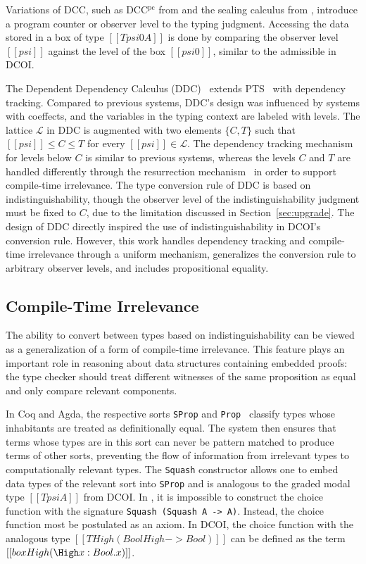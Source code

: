 \documentclass[acmsmall]{acmart}
\newcommand{\name}{DCOI\xspace}
\begin{document}
Variations of DCC, such as DCC$^{\text{pc}}$ from
\citet{tse2004translating} and the sealing
calculus from \citet{shikuma2008proving}, introduce a program counter
or observer level to the typing judgment. Accessing the data
stored in a box of type $[[T psi0 A]]$ is done by comparing the observer
level $[[psi]]$ against the level of the box $[[psi0]]$, similar to
the admissible  in \name{}. 

The Dependent Dependency Calculus (DDC)~\citep{choudhury:ddc} extends
PTS~\citep{barendregt:lambda-calculi-with-types} with dependency tracking.
Compared to previous systems,
DDC's design was influenced by systems with coeffects, and the
variables in the typing context are labeled with levels.
The lattice $\mathcal{L}$ in DDC is augmented with two elements $\{C, T\}$ such that
$[[psi]] \leq C \leq T$ for every $[[psi]] \in \mathcal{L}$.
The dependency tracking mechanism for levels
below $C$ is similar to previous systems,
whereas the levels $C$ and $T$
are handled differently through the 
resurrection mechanism~\citep{pfenning:irrelevance} in order to support
compile-time irrelevance. The type conversion rule of DDC is based on
indistinguishability, though the observer level of the
indistinguishability judgment must be fixed to $C$, due to the
limitation discussed in Section~\ref{sec:upgrade}.
The design of DDC directly inspired the use of indistinguishability in
\name{}'s conversion rule. However, this work handles dependency tracking and
compile-time irrelevance through a uniform mechanism, generalizes
the conversion rule to arbitrary observer levels, and includes propositional equality.

\subsection{Compile-Time Irrelevance}
The ability to convert between types based on indistinguishability can
be viewed as a generalization of a form of compile-time
irrelevance. This feature plays an important role in
reasoning about data structures containing embedded proofs: the type checker
should treat different witnesses of the same proposition as equal and
only compare relevant components.

In Coq and Agda, the respective sorts \lstinline{SProp} and
\lstinline{Prop}~\citep{gilbert2019definitional} classify types whose
inhabitants are treated as definitionally equal. The system then ensures that
terms whose types are in this sort can never be pattern matched to produce
terms of other sorts, preventing the flow of information from irrelevant types
to computationally relevant types. The \lstinline{Squash} constructor
allows one to embed data types of the relevant sort into
\lstinline{SProp} and is analogous to the graded modal type $[[T psi
A]]$ from \name{}.
In \citet{gilbert2019definitional}, it is
impossible to construct the choice function with the
signature \lstinline{Squash (Squash A -> A)}. Instead, the choice
function most be postulated as an axiom.
In \name{}, the choice function with the analogous type $[[T High (Bool
High -> Bool)]]$ can be defined as the term $[[ box High (\High x : Bool
. x)]]$.
\end{document}
